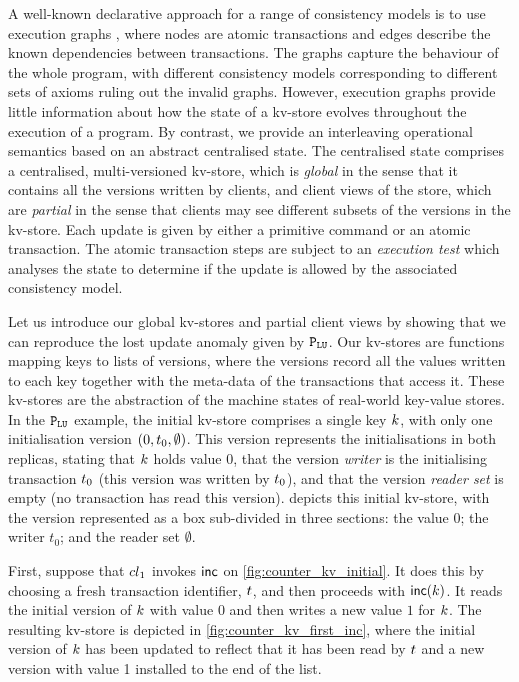 

A well-known declarative approach for a range of consistency models
is to use execution graphs \cite{adya-icde,adya,framework-concur,ev_transactions},
where nodes are atomic transactions and edges describe the
known dependencies between transactions. The graphs capture the
behaviour of the whole program, with different consistency models
corresponding to different sets of axioms ruling out the invalid graphs. 
However, execution graphs provide little information about how the 
state of a kv-store evolves throughout the execution of a program.
By contrast, we provide an interleaving operational semantics based on an
abstract centralised state. The centralised state comprises a
centralised, multi-versioned kv-store, which is {\em global} in the
sense that it contains all the versions written by clients, and client views of the store,
which are {\em partial} in the sense that clients may see different 
subsets of the versions in the kv-store. Each update is given by either
a primitive command or an atomic transaction. The atomic
transaction steps are subject to an {\em execution test} which
analyses the state to determine if the update is allowed by 
the associated consistency model. 


Let us introduce our global kv-stores and partial client views by
showing that we can reproduce the lost update anomaly given by 
\(\mathtt{P}_{\mathtt{LU}}\).
Our kv-stores are functions mapping keys to lists of versions, where
the versions  record all the values written to each key together with the
meta-data of the transactions that access it. 
These kv-stores are the abstraction of the machine states of real-world key-value stores.
In the \(\mathtt{P}_{\mathtt{LU}}\) example, the initial kv-store comprises a single key \(k\), with only one initialisation version \((0, t_{0}, \emptyset)\).
This version represents the initialisations in both replicas,
stating that \(k\) holds value \(0\), 
that the version \emph{writer} is the initialising transaction
\(t_0\) (this version was written by \(t_0\)), 
and that the version \emph{reader set} is empty (no transaction has read this version). 
 depicts this initial kv-store, with the version
represented as a box sub-divided in three sections: the value \(0\);
the writer \(t_0\); and the reader set \(\emptyset\). 


First, suppose that \({cl}_1\) invokes \(\mathsf{inc}\) on \cref{fig:counter_kv_initial}. 
It does this by choosing a fresh transaction identifier, \(t\), 
and then proceeds with \(\mathsf{inc}(k)\). It reads the initial version
of \(k\) with value \(0\) 
and then writes a new value \(1\) for \(k\). 
The resulting kv-store is depicted in \cref{fig:counter_kv_first_inc},
where  the initial version of \(k\)  has been  updated to reflect that it
has been read by \(t\) and a new version with value 1 installed to the end of the list.


